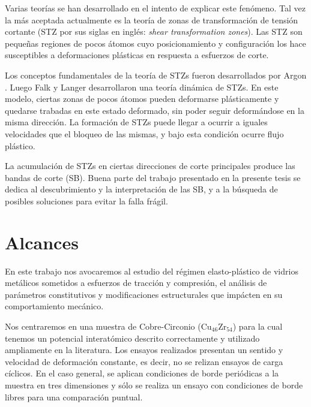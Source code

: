 Varias teorías se han desarrollado en el intento de explicar este fenómeno. Tal vez la más aceptada actualmente es la teoría de zonas de transformación de tensión cortante (STZ por sus siglas en inglés: \textit{shear transformation zones}). Las STZ son pequeñas regiones de pocos átomos cuyo posicionamiento y configuración los hace susceptibles a deformaciones plásticas en respuesta a esfuerzos de corte.

Los conceptos fundamentales de la teoría de STZs fueron desarrollados por Argon \cite{argon79}. Luego Falk y Langer \cite{Falk98, Langer07} desarrollaron una teoría dinámica de STZs. En este modelo, ciertas zonas de pocos átomos pueden deformarse plásticamente y quedarse trabadas en este estado deformado, sin poder seguir deformándose en la misma dirección. La formación de STZs puede llegar a ocurrir a iguales velocidades que el bloqueo de las mismas, y bajo esta condición ocurre flujo plástico.

La acumulación de STZs en ciertas direcciones de corte principales produce las bandas de corte (SB). Buena parte del trabajo presentado en la presente tesis se dedica al descubrimiento y la interpretación de las SB, y a la búsqueda de posibles soluciones para evitar la falla frágil.



\section{Alcances}
\label{S1_7}

En este trabajo nos avocaremos al estudio del régimen elasto-plástico de vidrios metálicos sometidos a esfuerzos de tracción y compresión, el análisis de parámetros constitutivos y modificaciones estructurales que impácten en su comportamiento mecánico.

Nos centraremos en una muestra de Cobre-Circonio (Cu$_{46}$Zr$_{54}$) para la cual tenemos un potencial interatómico descrito correctamente y utilizado ampliamente en la literatura. Los ensayos realizados presentan un sentido y velocidad de deformación constante, es decir, no se relizan ensayos de carga cíclicos. En el caso general, se aplican condiciones de borde periódicas a la muestra en tres dimensiones y sólo se realiza un ensayo con condiciones de borde libres para una comparación puntual.


